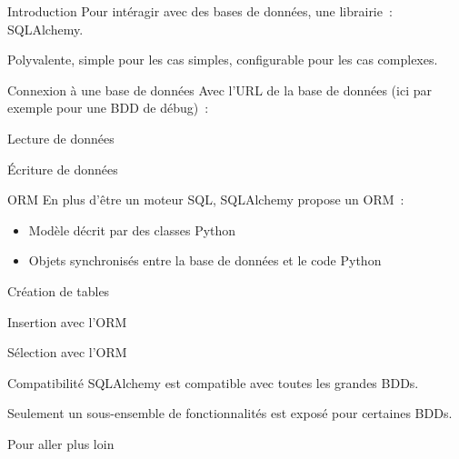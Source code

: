 \begin{frame}{Introduction}
  Pour intéragir avec des bases de données, une librairie~: SQLAlchemy.

  Polyvalente, simple pour les cas simples, configurable pour les cas complexes.
\end{frame}

\begin{frame}{Connexion à une base de données}
  Avec l'URL de la base de données (ici par exemple pour une BDD de débug)~:

\end{frame}

\begin{frame}{Lecture de données}
\end{frame}

\begin{frame}{Écriture de données}
\end{frame}

\begin{frame}{ORM}
  En plus d'être un moteur SQL, SQLAlchemy propose un ORM~:

  \begin{itemize}
    \item Modèle décrit par des classes Python
    \item Objets synchronisés entre la base de données et le code Python
  \end{itemize}
\end{frame}

\begin{frame}{Création de tables}
\end{frame}

\begin{frame}{Insertion avec l'ORM}
\end{frame}

\begin{frame}{Sélection avec l'ORM}
\end{frame}

\begin{frame}{Compatibilité}
  SQLAlchemy est compatible avec toutes les grandes BDDs.

  Seulement un sous-ensemble de fonctionnalités est exposé pour certaines BDDs.
\end{frame}

\begin{frame}{Pour aller plus loin}
\end{frame}
